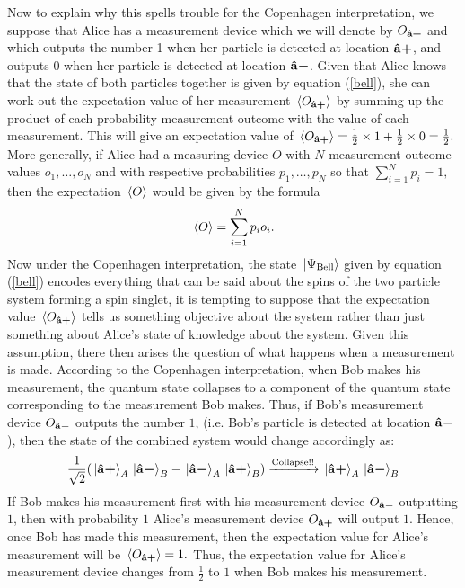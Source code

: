 Now to explain why this spells trouble for the Copenhagen interpretation, we suppose that Alice has a measurement device which we will denote by $O_{\vb{\hat{{a}}}\bm{+}}$\label{Lambdaa} and which outputs the number 1 when her particle is detected at location $\vb{\hat{{a}}}\bm{+}$, and outputs 0 when her particle is detected at location $\vb{\hat{{a}}}\bm{-}$. Given that Alice knows that the state of both particles together is given by equation (\ref{bell}), she can work out the expectation value of her measurement $\ev*{O_{\uvbp{a}}}$ by summing up the product of each probability measurement outcome with the value of each measurement. This will give an expectation value of $\ev*{O_{\uvbp{a}}}=\frac{1}{2}\times 1 + \frac{1}{2}\times 0 = \frac{1}{2}.$ More generally, if Alice had a measuring device $O$ with $N$ measurement outcome values $o_1,\ldots,o_N$ and with respective probabilities $p_1,\ldots,p_N$ so that $\sum_{i=1}^N p_i=1,$ then the expectation $\ev*{O}$ would be given by the formula
\begin{equation}\label{expectation}\ev*{O} =\sum_{i=1}^N p_io_i.
\end{equation}
Now under the Copenhagen interpretation, the state $\ket*{\Psi_{\text{Bell}}}$ given by equation (\ref{bell}) encodes everything that can be said about the spins of the two particle system forming a spin singlet, it is tempting to suppose that the expectation value $\ev*{O_{\uvbp{a}}}$ tells us something objective about the system rather than just something about Alice's state of knowledge about the system.  Given this assumption, there then arises the question of what happens when a measurement is made. According to the Copenhagen interpretation, when Bob makes his measurement, the quantum state collapses to a component of the quantum state corresponding to the measurement Bob makes. Thus, if Bob's measurement device $O_{\vb{\hat{{a}}}\bm{-}}$ outputs the number $1$, (i.e. Bob's particle is detected at location $\vb{\hat{{a}}}\bm{-}$), then the state of the combined system would change accordingly as:
$$\frac{1}{\sqrt{2}}(\ket*{\vb{\hat{{a}}}\bm{+}}_A\ket*{\vb{\hat{{a}}}\bm{-}}_B-\ket*{\vb{\hat{{a}}}\bm{-}}_A\ket*{\vb{\hat{{a}}}\bm{+}}_B)\xrightarrow{\text{Collapse!!}}\ket*{\vb{\hat{{a}}}\bm{+}}_A\ket*{\vb{\hat{{a}}}\bm{-}}_B $$
If Bob makes his measurement first with his measurement device $O_{\vb{\hat{{a}}}\bm{-}}$  outputting $1$, then with probability $1$ Alice's measurement device $O_{\vb{\hat{{a}}}\bm{+}}$ will output $1$. Hence, once Bob has made this measurement, then the expectation value for Alice's measurement will be $\ev*{O_{\uvbp{a}}}=1.$ Thus, the expectation value for Alice's measurement device changes from $\frac{1}{2}$ to $1$ when Bob makes his measurement.
 
